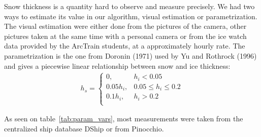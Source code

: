 \documentclass[a4paper,12pt]{article}
\begin{document}
Snow thickness is a quantity hard to observe and measure precisely. We had two ways to estimate its value in our algorithm, visual estimation or parametrization. The visual estimation were either done from the pictures of the camera, other pictures taken at the same time with a personal camera or from the ice watch data provided by the ArcTrain students, at a approximately hourly rate. The parametrization is the one from Doronin (1971) used by Yu and Rothrock (1996) and gives a piecewise linear relationship between snow and ice thickness:
\begin{align}
h_s = \left\{\begin{matrix}
0,       & h_i < 0.05           \\
0.05h_i, & 0.05 \le h_i \le 0.2 \\
0.1h_i,  & h_i > 0.2            \\ 
\end{matrix}\right.
\end{align}

As seen on table~\ref{tab:param_vars}, most measurements were taken from the centralized ship database DShip or from Pinocchio.
\end{document}
